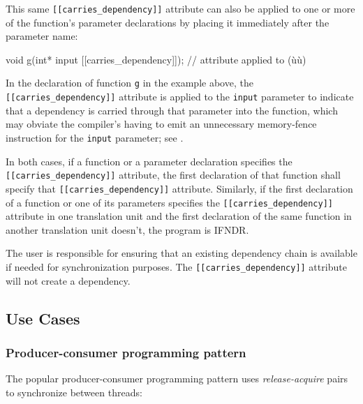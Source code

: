 This same \lstinline![[carries_dependency]]! attribute can also be applied
to one or more of the function's parameter declarations by placing it
immediately after the parameter name:

\begin{emcppslisting}[language=C++]
void g(int* input [[carries_dependency]]); // attribute applied to (ù{}ù)
\end{emcppslisting}
    
\noindent In the declaration of function \lstinline!g! in the example above, the
\lstinline![[carries_dependency]]! attribute is applied to the
\lstinline!input! parameter to indicate that a dependency is carried
through that parameter into the function, which may obviate the
compiler's having to emit an unnecessary memory-fence instruction for
the \lstinline!input! parameter; see .

In both cases, if a function or a parameter declaration specifies the
\lstinline![[carries_dependency]]! attribute, the first declaration of
that function shall specify that \lstinline![[carries_dependency]]!
attribute. Similarly, if the first declaration of a function or one of
its parameters specifies the \lstinline![[carries_dependency]]! attribute
in one translation unit and the first declaration of the same function
in another translation unit doesn't, the program is IFNDR.

The user is responsible for ensuring that an existing dependency chain
is available if needed for synchronization purposes. The
\lstinline![[carries_dependency]]! attribute will not create a \mbox{dependency}.

\subsection[Use Cases]{Use Cases}\label{use-cases-carriesdependency}

\subsubsection[Producer-consumer programming pattern]{Producer-consumer programming pattern}\label{producer-consumer-programming-pattern}

The popular producer-consumer programming pattern uses
\emph{release-acquire} pairs to synchronize between threads:

